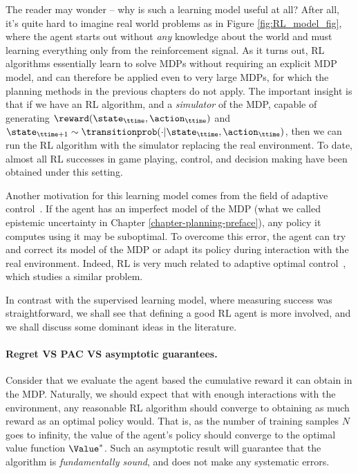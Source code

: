 The reader may wonder -- why is such a learning model useful at all? After all, it's quite hard to imagine real world problems as in Figure \ref{fig:RL_model_fig}, where the agent starts out without \textit{any} knowledge about the world and must learning everything only from the reinforcement signal. As it turns out, RL algorithms essentially learn to solve MDPs without requiring an explicit MDP model, and can therefore be applied even to very large MDPs, for which the planning methods in the previous chapters do not apply. The important insight is that if we have an RL algorithm, and a \textit{simulator} of the MDP, capable of generating $\reward(\state_\ttime,\action_\ttime)$ and $\state_{\ttime+1}\sim \transitionprob(\cdot | \state_\ttime, \action_\ttime)$, then we can run the RL algorithm with the simulator replacing the real environment. To date, almost all RL successes in game playing, control, and decision making have been obtained under this setting.

Another motivation for this learning model comes from the field of adaptive control~\cite{astrom2008adaptive}. If the agent has an imperfect model of the MDP (what we called epistemic uncertainty in Chapter \ref{chapter-planning-preface}), any policy it computes using it may be suboptimal. To overcome this error, the agent can try and correct its model of the MDP or adapt its policy during interaction with the real environment. Indeed, RL is very much related to adaptive optimal control~\cite{sutton1992reinforcement}, which studies a similar problem.




In contrast with the supervised learning model, where measuring success was straightforward, we shall see that defining a good RL agent is more involved, and we shall discuss some dominant ideas in the literature.

\paragraph{Regret VS PAC VS asymptotic guarantees.} Consider that we evaluate the agent based the cumulative reward it can obtain in the MDP. Naturally, we should expect that with enough interactions with the environment, any reasonable RL algorithm should converge to obtaining as much reward as an optimal policy would. That is, as the number of training samples $N$ goes to infinity, the value of the agent's policy should converge to the optimal value function $\Value^*$. Such an asymptotic result will guarantee that the algorithm is \textit{fundamentally sound}, and does not make any systematic errors.

